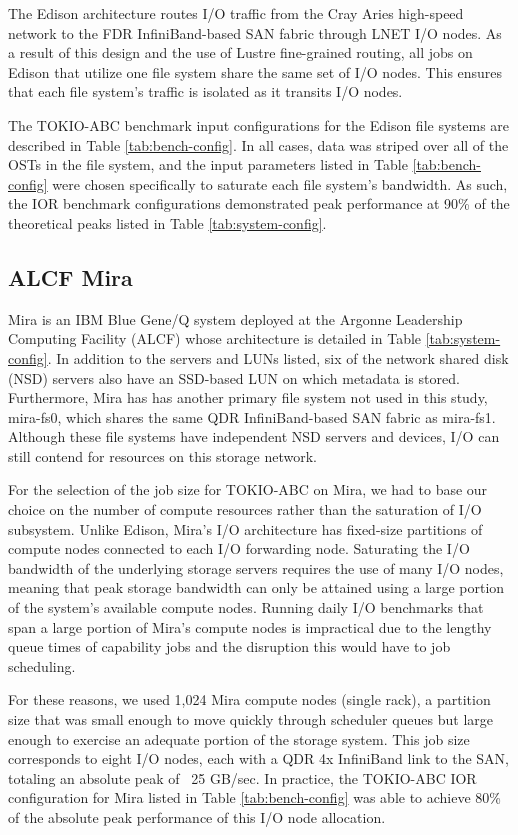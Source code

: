 The Edison architecture routes I/O traffic from the Cray Aries high-speed network to the FDR InfiniBand-based SAN fabric through LNET I/O nodes.
As a result of this design and the use of Lustre fine-grained routing, all jobs on Edison that utilize one file system share the same set of I/O nodes.
This ensures that each file system's traffic is isolated as it transits I/O nodes.

The TOKIO-ABC benchmark input configurations for the Edison file systems are described in Table \ref{tab:bench-config}.
In all cases, data was striped over all of the OSTs in the file system, and the input parameters listed in Table \ref{tab:bench-config} were chosen specifically to saturate each file system's bandwidth.
As such, the IOR benchmark configurations demonstrated peak performance at 90\% of the theoretical peaks listed in Table \ref{tab:system-config}.

\subsection{ALCF Mira} \label{sec:platforms/mira}

Mira is an IBM Blue Gene/Q system deployed at the Argonne Leadership Computing Facility (ALCF) whose architecture is detailed in Table \ref{tab:system-config}.  In addition to the servers and LUNs listed, six of the network shared disk (NSD) servers also have an SSD-based LUN on which metadata is stored.  Furthermore, 
Mira has has another primary file system not used in this study, mira-fs0, which shares the same QDR InfiniBand-based SAN fabric as mira-fs1.
Although these file systems have independent NSD servers and devices, I/O can still contend for resources on this storage network.

For the selection of the job size for TOKIO-ABC on Mira, we had to
base our choice on the number of compute resources rather than the saturation of
I/O subsystem.
Unlike Edison, Mira's I/O architecture has fixed-size partitions of compute nodes connected to each I/O forwarding node.
Saturating the I/O bandwidth of the underlying storage servers requires the
use of many I/O nodes, meaning that peak storage bandwidth can only be
attained using a large portion of the system's available compute nodes.
Running daily I/O benchmarks that span a large portion of Mira's compute
nodes is impractical due to the lengthy queue times of capability jobs and
the disruption this would have to job scheduling.

For these reasons, we used 1,024 Mira compute nodes (single
rack), a partition size that was small enough to move quickly through
scheduler queues but large enough to exercise an adequate portion of the
storage system.  This job size corresponds to eight I/O nodes, each with a QDR 4x InfiniBand link to the SAN, totaling an absolute peak of ~25 GB/sec.
In practice, the TOKIO-ABC IOR configuration for Mira listed in Table \ref{tab:bench-config} was able to achieve 80\% of the absolute peak performance of this I/O node allocation.